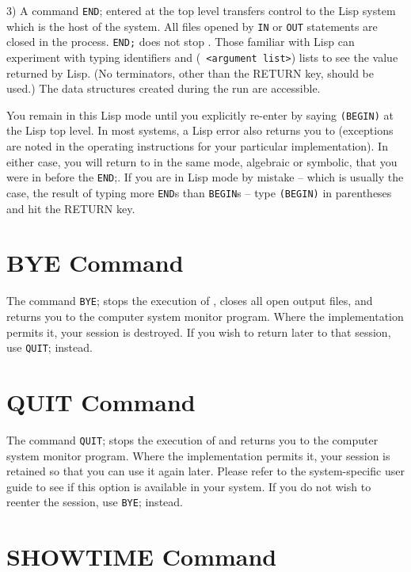 3) A command {\tt END}; entered at the top level transfers control to the
Lisp system which is the host of the {\REDUCE} system.  All
files opened by {\tt IN} or {\tt OUT} statements are closed in the
process.  {\tt END;} does not stop {\REDUCE}.  Those familiar with Lisp can
experiment with typing identifiers and ({\tt <function name> <argument
list>}) lists to see the value returned by Lisp. (No terminators, other
than the RETURN key, should be used.) The data structures created during
the {\REDUCE} run are accessible.

You remain in this Lisp mode until you explicitly re-enter {\REDUCE} by
saying {\tt (BEGIN)} at the Lisp top level.  In most systems, a Lisp error
also returns you to {\REDUCE} (exceptions are noted in the operating
instructions for your particular {\REDUCE} implementation).  In either
case, you will return to {\REDUCE} in the same mode, algebraic or
symbolic, that you were in before the {\tt END};.  If you are in
Lisp mode by mistake -- which is usually the case,
the result of typing more {\tt END}s than {\tt BEGIN}s --
type {\tt (BEGIN)} in parentheses and hit the RETURN key.

\section{BYE Command}

The command {\tt BYE}; stops the execution of {\REDUCE}, closes all open
output files, and returns you to the computer system monitor program.
Where the implementation permits it, your {\REDUCE} session is destroyed.
If you wish to return later to that session, use {\tt QUIT}; instead.

\section{QUIT Command}

The command {\tt QUIT}; stops the execution of {\REDUCE} and returns you to
the computer system monitor program.  Where the implementation permits it,
your {\REDUCE} session is retained so that you can use it again later.
Please refer to the system-specific user guide to see if this option is
available in your system.  If you do not wish to reenter the {\REDUCE}
session, use {\tt BYE}; instead.


\section{SHOWTIME Command}

